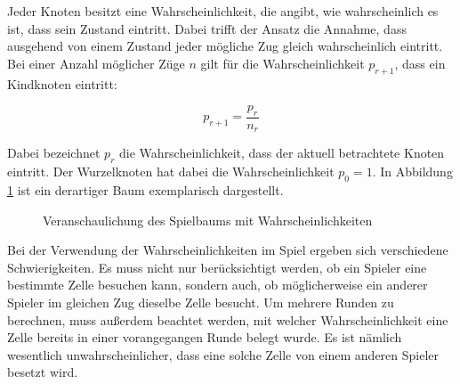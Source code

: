 \documentclass[12pt,a4paper]{article}
\begin{document}
Jeder Knoten besitzt eine Wahrscheinlichkeit, die angibt, wie wahrscheinlich es ist, dass sein Zustand eintritt. Dabei trifft der Ansatz die Annahme, dass ausgehend von einem Zustand jeder mögliche Zug gleich wahrscheinlich eintritt. Bei einer Anzahl möglicher Züge $n$ gilt für die Wahrscheinlichkeit $p_{r+1}$, dass ein Kindknoten eintritt:

$$p_{r+1} = \frac{p_r}{n_r}$$

Dabei bezeichnet $p_r$ die Wahrscheinlichkeit, dass der aktuell betrachtete Knoten eintritt. Der Wurzelknoten hat dabei die Wahrscheinlichkeit $p_0 = 1$. In Abbildung \ref{fig:probability-tree} ist ein derartiger Baum exemplarisch dargestellt.

\begin{figure}[h]
    \centering
    \caption{Veranschaulichung des Spielbaums mit Wahrscheinlichkeiten}
    \label{fig:probability-tree}
\end{figure}

Bei der Verwendung der Wahrscheinlichkeiten im Spiel ergeben sich verschiedene Schwierigkeiten. Es muss nicht nur berücksichtigt werden, ob ein Spieler eine bestimmte Zelle besuchen kann, sondern auch, ob möglicherweise ein anderer Spieler im gleichen Zug dieselbe Zelle besucht. Um mehrere Runden zu berechnen, muss außerdem beachtet werden, mit welcher Wahrscheinlichkeit eine Zelle bereits in einer vorangegangen Runde belegt wurde. Es ist nämlich wesentlich unwahrscheinlicher, dass eine solche Zelle von einem anderen Spieler besetzt wird.
\end{document}
